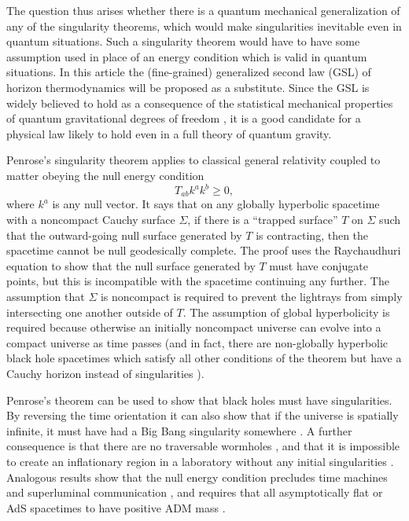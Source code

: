 \documentclass{article}
\begin{document}
The question thus arises whether there is a quantum mechanical generalization of any of the singularity theorems, which would make singularities inevitable even in quantum situations.  Such a singularity theorem would have to have some assumption used in place of an energy condition which is valid in quantum situations.  In this article the (fine-grained) generalized second law (GSL) of horizon thermodynamics will be proposed as a substitute.  Since the GSL is widely believed to hold as a consequence of the statistical mechanical properties of quantum gravitational degrees of freedom \cite{BHstat}, it is a good candidate for a physical law likely to hold even in a full theory of quantum gravity.

Penrose's singularity theorem \cite{HawkingEllis} applies to classical general relativity coupled to matter obeying the null energy condition
\begin{equation}\label{NEC}
T_{ab} k^a k^b \ge 0,
\end{equation}
where $k^a$ is any null vector.  It says that on any globally hyperbolic spacetime with a noncompact Cauchy surface $\Sigma$, if there is a ``trapped surface'' $T$ on $\Sigma$ such that the outward-going null surface generated by $T$ is contracting, then the spacetime cannot be null geodesically complete.  The proof uses the Raychaudhuri equation to show that the null surface generated by $T$ must have conjugate points, but this is incompatible with the spacetime continuing any further.  The assumption that $\Sigma$ is noncompact is required to prevent the lightrays from simply intersecting one another outside of $T$.  The assumption of global hyperbolicity is required because otherwise an initially noncompact universe can evolve into a compact universe as time passes (and in fact, there are non-globally hyperbolic black hole spacetimes which satisfy all other conditions of the theorem but have a Cauchy horizon instead of singularities \cite{HawkingEllis}).

Penrose's theorem can be used to show that black holes must have singularities.  By reversing the time orientation it can also show that if the universe is spatially infinite, it must have had a Big Bang singularity somewhere \cite{HawkingEllis}.  A further consequence is that there are no traversable wormholes \cite{worm}, and that it is impossible to create an inflationary region in a laboratory without any initial singularities \cite{obstacle}.  Analogous results show that the null energy condition precludes time machines \cite{noctc} and superluminal communication \cite{olum, supercensor, woolgar94, GW00}, and requires that all asymptotically flat or AdS spacetimes to have positive ADM mass \cite{SPW, woolgar94, GW00}.
\end{document}
